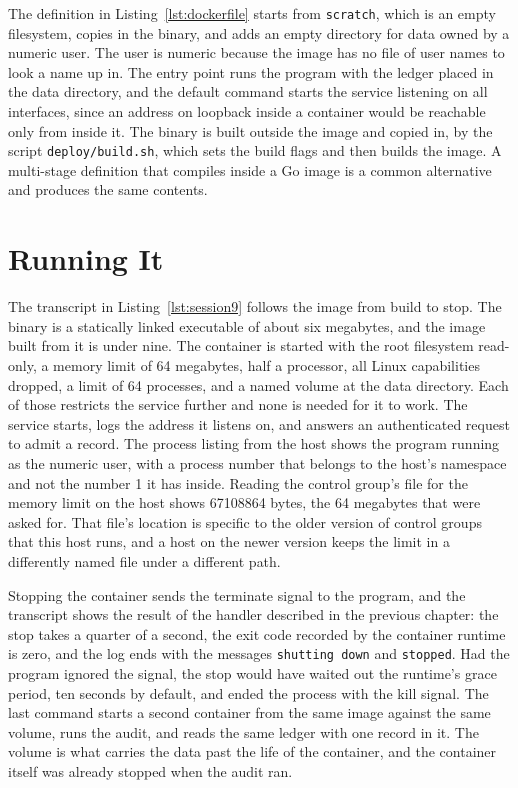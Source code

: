 

The definition in Listing~\ref{lst:dockerfile} starts from \texttt{scratch}, which is an empty filesystem, copies in the binary, and adds an empty directory for data owned by a numeric user. The user is numeric because the image has no file of user names to look a name up in. The entry point runs the program with the ledger placed in the data directory, and the default command starts the service listening on all interfaces, since an address on loopback inside a container would be reachable only from inside it. The binary is built outside the image and copied in, by the script \texttt{deploy/build.sh}, which sets the build flags and then builds the image. A multi-stage definition that compiles inside a Go image is a common alternative and produces the same contents.

\section{Running It}



The transcript in Listing~\ref{lst:session9} follows the image from build to stop. The binary is a statically linked executable of about six megabytes, and the image built from it is under nine. The container is started with the root filesystem read-only, a memory limit of 64 megabytes, half a processor, all Linux capabilities dropped, a limit of 64 processes, and a named volume at the data directory. Each of those restricts the service further and none is needed for it to work. The service starts, logs the address it listens on, and answers an authenticated request to admit a record. The process listing from the host shows the program running as the numeric user, with a process number that belongs to the host's namespace and not the number 1 it has inside. Reading the control group's file for the memory limit on the host shows 67108864 bytes, the 64 megabytes that were asked for. That file's location is specific to the older version of control groups that this host runs, and a host on the newer version keeps the limit in a differently named file under a different path.

Stopping the container sends the terminate signal to the program, and the transcript shows the result of the handler described in the previous chapter: the stop takes a quarter of a second, the exit code recorded by the container runtime is zero, and the log ends with the messages \texttt{shutting down} and \texttt{stopped}. Had the program ignored the signal, the stop would have waited out the runtime's grace period, ten seconds by default, and ended the process with the kill signal. The last command starts a second container from the same image against the same volume, runs the audit, and reads the same ledger with one record in it. The volume is what carries the data past the life of the container, and the container itself was already stopped when the audit ran.

